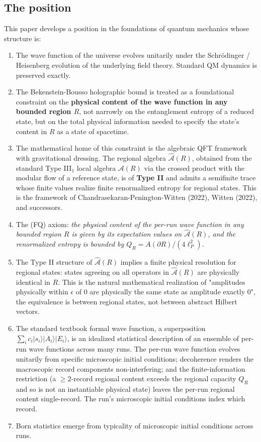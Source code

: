 \documentclass[11pt,a4paper]{article}
\begin{document}
\subsection{The position}

This paper develops a position in the foundations of quantum mechanics whose structure is:

\begin{enumerate}
  \item The wave function of the universe evolves unitarily under the Schrödinger / Heisenberg evolution of the underlying field theory. Standard QM dynamics is preserved exactly.
  \item The Bekenstein-Bousso holographic bound is treated as a foundational constraint on the \textbf{physical content of the wave function in any bounded region $R$}, not narrowly on the entanglement entropy of a reduced state, but on the total physical information needed to specify the state's content in $R$ as a state of spacetime.
  \item The mathematical home of this constraint is the algebraic QFT framework with gravitational dressing. The regional algebra $\hat{\mathcal{A}}(R)$, obtained from the standard Type III$_1$ local algebra $\mathcal{A}(R)$ via the crossed product with the modular flow of a reference state, is of \textbf{Type II} and admits a semifinite trace whose finite values realize finite renormalized entropy for regional states. This is the framework of Chandrasekaran-Penington-Witten (2022), Witten (2022), and successors.
  \item The (FQ) axiom: \emph{the physical content of the per-run wave function in any bounded region $R$ is given by its expectation values on $\hat{\mathcal{A}}(R)$, and the renormalized entropy is bounded by $Q_R = A(\partial R)/(4\ell_P^2)$.}
  \item The Type II structure of $\hat{\mathcal{A}}(R)$ implies a finite physical resolution for regional states: states agreeing on all operators in $\hat{\mathcal{A}}(R)$ are physically identical in $R$. This is the natural mathematical realization of "amplitudes physically within $\epsilon$ of $0$ are physically the same state as amplitude exactly $0$", the equivalence is between regional states, not between abstract Hilbert vectors.
  \item The standard textbook formal wave function, a superposition $\sum_i c_i |s_i\rangle|A_i\rangle|E_i\rangle$, is an idealized statistical description of an ensemble of per-run wave functions across many runs. The per-run wave function evolves unitarily from specific microscopic initial conditions; decoherence renders the macroscopic record components non-interfering; and the finite-information restriction (a $\ge 2$-record regional content exceeds the regional capacity $Q_R$ and so is not an instantiable physical state) leaves the per-run regional content single-record. The run's microscopic initial conditions index which record.
  \item Born statistics emerge from typicality of microscopic initial conditions across runs.
\end{enumerate}
\end{document}
